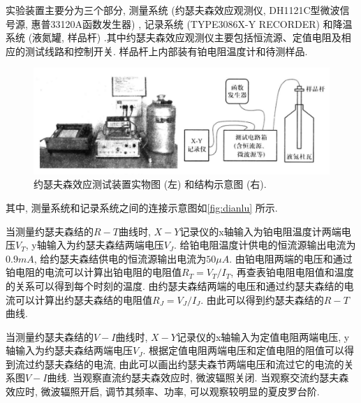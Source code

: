 \documentclass[font=default]{mpltx}
\newcommand{\note}[1]{{\color{gray}#1}}
\newcommand*\cs[1]{\texttt{\textbackslash #1}}
\begin{document}
  实验装置主要分为三个部分, 测量系统 (约瑟夫森效应观测仪, DH1121C型微波信号源, 惠普33120A函数发生器) , 记录系统 (TYPE3086X-Y RECORDER) 和降温系统 (液氮罐, 样品杆) .其中约瑟夫森效应观测仪主要包括恒流源、定值电阻及相应的测试线路和控制开关. 样品杆上内部装有铂电阻温度计和待测样品. 



\begin{figure}
  \centering
  \includegraphics[width=0.85\linewidth]{fig/1.png}
  \caption{约瑟夫森效应测试装置实物图 (左) 和结构示意图 (右).
    }
  \label{fig:dianlu}
\end{figure}

  其中, 测量系统和记录系统之间的连接示意图如\autoref{fig:dianlu} 所示.
  \par
  当测量约瑟夫森结的$R-T$曲线时, $X-Y$记录仪的x轴输入为铂电阻温度计两端电压$V_T$, y轴输入为约瑟夫森结两端电压$V_J$. 给铂电阻温度计供电的恒流源输出电流为$0.9mA$, 
  给约瑟夫森结供电的恒流源输出电流为$50\mu A$. 由铂电阻两端的电压和通过铂电阻的电流可以计算出铂电阻的电阻值$R_T=V_T/I_T$, 再查表铂电阻电阻值和温度的关系可以得到每个时刻的温度.
  由约瑟夫森结两端的电压和通过约瑟夫森结的电流可以计算出约瑟夫森结的电阻值$R_J=V_J/I_J$. 由此可以得到约瑟夫森结的$R-T$曲线.
  \par
  当测量约瑟夫森结的$V-I$曲线时, $X-Y$记录仪的x轴输入为定值电阻两端电压, y轴输入为约瑟夫森结两端电压$V_J$. 
  根据定值电阻两端电压和定值电阻的阻值可以得到流过约瑟夫森结的电流, 由此可以画出约瑟夫森节两端电压和流过它的电流的关系图$V-I$曲线.
  当观察直流约瑟夫森效应时, 微波辐照关闭. 当观察交流约瑟夫森效应时, 微波辐照开启, 调节其频率、功率, 可以观察较明显的夏皮罗台阶.
\end{document}

